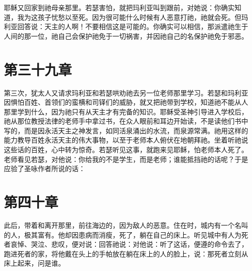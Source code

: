耶稣又回家到祂母亲那里。若瑟害怕，就把玛利亚叫到跟前，对她说：你确实知道，我为这孩子忧愁以至死。因为很可能什么时候有人恶意打祂，祂就会死。但玛利亚回答说：天主的人啊！不要相信这是可能的。你确实可以相信，那派遣祂生于人间的那一位，祂自己会保护祂免于一切祸害，并因祂自己的名保护祂免于邪恶。\par


\section{第三十九章}

第三次，犹太人又请求玛利亚和若瑟哄劝祂去另一位老师那里学习。若瑟和玛利亚因惧怕百姓、首领们的蛮横和司铎们的威胁，就又把祂带到学校，知道祂不能从人那里学到什么，因为祂只有从天主才有完备的知识。耶稣受圣神引导进入学校后，祂从那位教授法律的老师手中拿过书，在众人眼前和耳边开始读，不是读他们书中写的，而是因永活天主之神发言，如同活泉涌出的水流，而泉源常满。祂用这样的能力教导百姓永活天主的伟大事物，以至于老师本人俯伏在地朝拜祂。坐着听祂说这些话的百姓，心中转为惊奇。若瑟听见这事，就跑来见耶稣，怕老师本人死了。老师看见若瑟，对他说：你给我的不是学生，而是老师；谁能抵挡祂的话呢？于是应验了圣咏作者所说的话：\par


\section{第四十章}

此后，带着和离开那里，前往海边的，因为敌人的恶意。住在时，城内有一个名叫的人，极其富有。他却因患病而消瘦，死了，躺在自己的床上。听见城中有人为死者哀悼、哭泣、悲叹，便对说：回答祂说：对他说：听了这话，便遵的命令去了，跑进死者的家，将他戴在头上的手帕放在躺在床上的人的脸上，说：那死者立刻从床上起来，问是谁。\par

